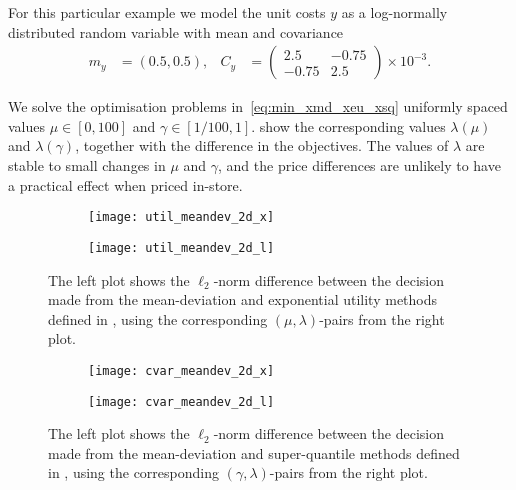 \documentclass[main.tex]{subfiles}
\begin{document}
\begin{example}
  For this particular example we model the unit costs $y$ as a log-normally
  distributed random variable with mean and covariance
  \begin{align}
    m_y
    &= (0.5,0.5),
    &C_y
    &=\begin{pmatrix}
      2.5&-0.75\\
      -0.75&2.5
    \end{pmatrix}
             \times 10^{-3}.
  \end{align}

  We solve the optimisation problems in~\eqref{eq:min_xmd_xeu_xsq}
  uniformly spaced values $\mu\in[0,100]$ and $\gamma\in[1/100, 1]$.
   show the
  corresponding values $\lambda(\mu)$ and $\lambda(\gamma)$, together
  with the difference in the objectives. The values of $\lambda$
  are stable to small changes in $\mu$ and $\gamma$, and the
  price differences are unlikely to have a practical effect when
  priced in-store.
  \begin{figure}[htbp]
    \centering
    \begin{subfigure}[t]{.5\textwidth}
      \texttt{[image: util\_meandev\_2d\_x]}
    \end{subfigure}%
    \begin{subfigure}[t]{.5\textwidth}
      \texttt{[image: util\_meandev\_2d\_l]}
    \end{subfigure}
    \caption{The left plot shows the $\ell_2$-norm difference between the decision made
      from the mean-deviation and exponential utility methods defined in
      , using the corresponding
      $(\mu,\lambda)$-pairs from the right plot.
    }\label{fig:util_meandev_2d}
  \end{figure}

  \begin{figure}[hbtp]
    \centering
    \begin{subfigure}[t]{.5\textwidth}
      \texttt{[image: cvar\_meandev\_2d\_x]}
    \end{subfigure}%
    \begin{subfigure}[t]{.5\textwidth}
      \texttt{[image: cvar\_meandev\_2d\_l]}
    \end{subfigure}
    \caption{The left plot shows the $\ell_2$-norm difference between the decision made
      from the mean-deviation and super-quantile methods defined in
      , using the corresponding
      $(\gamma,\lambda)$-pairs from the right plot.
    }\label{fig:cvar_meandev_2d}
  \end{figure}
\end{example}
\end{document}
